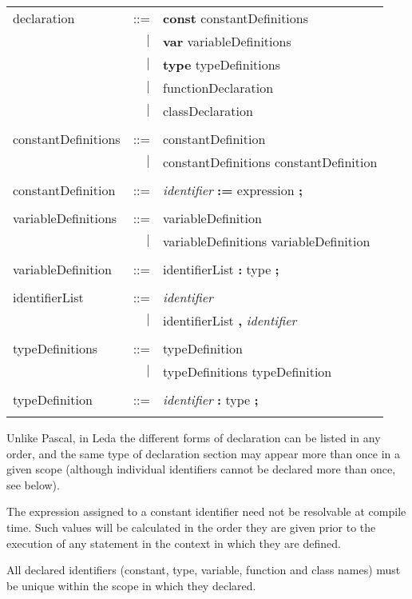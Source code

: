 \begin{tabular}{l r l}
declaration & ::= & {\bf const} constantDefinitions \\
& $\mid$ & {\bf var} variableDefinitions \\
& $\mid$ & {\bf type} typeDefinitions \\
& $\mid$ & functionDeclaration \\
& $\mid$ & classDeclaration \\ \\
constantDefinitions & ::= & constantDefinition \\
& $\mid$ & constantDefinitions constantDefinition \\ \\
constantDefinition & ::= & {\em identifier} {\bf :=} expression {\bf ;} \\ \\
variableDefinitions & ::= & variableDefinition \\
& $\mid$ & variableDefinitions variableDefinition \\ \\
variableDefinition & ::= & identifierList {\bf :} type {\bf ;} \\ \\
identifierList & ::= & {\em identifier} \\
& $\mid$ & identifierList {\bf ,} {\em identifier} \\ \\
typeDefinitions & ::= & typeDefinition \\
& $\mid$ & typeDefinitions typeDefinition \\ \\
typeDefinition & ::= & {\em identifier} {\bf :} type {\bf ;} \\ \\
\end{tabular}

Unlike Pascal, in Leda the different forms of declaration can be listed
in any order, and the same type of declaration section may appear more
than once in a given scope (although individual identifiers cannot
be declared more than once, see below).

The expression assigned to a constant identifier need not be resolvable
at compile time. Such values will be calculated in the order they
are given prior to the execution of any statement in the context
in which they are defined.

All declared identifiers (constant, type, variable, function and class names)
must be unique within the scope in which they declared.

